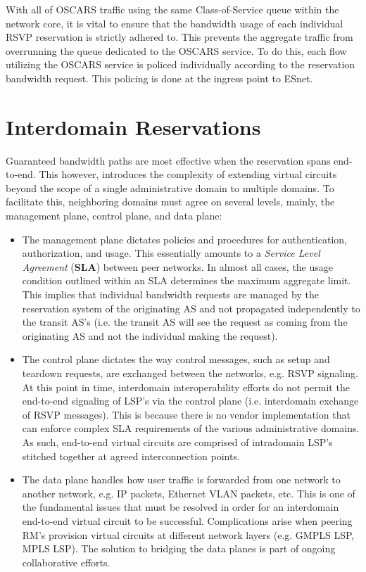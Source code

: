 \documentclass[conference]{IEEEtran}
\begin{document}
With all of OSCARS traffic using the same Class-of-Service queue within the 
network core, it is vital to ensure that the bandwidth usage of each individual 
RSVP reservation is strictly adhered to.  This prevents the aggregate traffic 
from overrunning the queue dedicated to the OSCARS service.  To do this, each 
flow utilizing the OSCARS service is policed individually according to the 
reservation bandwidth request.  This policing is done at the ingress point to 
ESnet.


\section{Interdomain Reservations}

Guaranteed bandwidth paths are most effective 
when the reservation spans end-to-end.  This however, introduces the 
complexity of extending virtual circuits beyond the scope of a 
single administrative domain to multiple domains.  To facilitate this, 
neighboring domains must agree on several levels, mainly, the management plane, 
control plane, and data plane:

\begin{itemize}
\item
The management plane dictates policies and procedures for authentication, 
authorization, and usage.  This essentially amounts to a \emph{Service Level 
Agreement} (\textbf{SLA}) between peer networks.  In almost all cases, the 
usage 
condition outlined within an SLA determines the maximum aggregate limit.  
This implies that individual bandwidth requests are managed by the reservation 
system of the originating AS and not propagated independently to the transit 
AS's 
(i.e. the transit AS will see the request as coming from the originating AS and not the individual making the request).

\item
The control plane dictates the way control messages, such as setup and 
teardown requests, are exchanged between the networks, e.g. RSVP signaling.
At this point in time, interdomain interoperability efforts do not permit
the end-to-end signaling of LSP's via the control plane (i.e. interdomain 
exchange of RSVP messages).  This is because
there is no vendor implementation that can enforce complex SLA requirements of 
the various administrative domains.  As such, end-to-end virtual circuits are
comprised
of intradomain LSP's stitched together at agreed interconnection points.

\item
The data plane handles how user traffic is forwarded from one network to 
another network, e.g. IP packets, Ethernet VLAN packets, etc.  This is one of 
the fundamental issues that must be resolved in order for an interdomain 
end-to-end virtual circuit to be successful.  Complications arise when 
peering RM's provision virtual circuits at different network layers (e.g. 
GMPLS LSP, MPLS LSP).  The solution to bridging the data planes is part of 
ongoing collaborative efforts.
\end{itemize}
\end{document}
